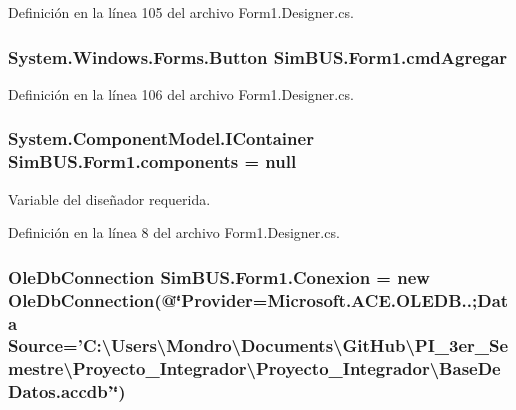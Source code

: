 Definición en la línea 105 del archivo Form1.\-Designer.\-cs.

\subsubsection[{cmd\-Agregar}]{\setlength{\rightskip}{0pt plus 5cm}System.\-Windows.\-Forms.\-Button Sim\-B\-U\-S.\-Form1.\-cmd\-Agregar\hspace{0.3cm}{\ttfamily [private]}}\label{class_sim_b_u_s_1_1_form1_abdbb52215827c126334c3a600b61fdc3}


Definición en la línea 106 del archivo Form1.\-Designer.\-cs.

\subsubsection[{components}]{\setlength{\rightskip}{0pt plus 5cm}System.\-Component\-Model.\-I\-Container Sim\-B\-U\-S.\-Form1.\-components = null\hspace{0.3cm}{\ttfamily [private]}}\label{class_sim_b_u_s_1_1_form1_af68a98b30fbbd7cb29f48f5b2c442670}


Variable del diseñador requerida. 



Definición en la línea 8 del archivo Form1.\-Designer.\-cs.

\subsubsection[{Conexion}]{\setlength{\rightskip}{0pt plus 5cm}Ole\-Db\-Connection Sim\-B\-U\-S.\-Form1.\-Conexion = new Ole\-Db\-Connection(@\char`\"{}Provider=Microsoft.\-A\-C\-E.\-O\-L\-E\-D\-B..;Data Source='C\-:\textbackslash{}\-Users\textbackslash{}\-Mondro\textbackslash{}\-Documents\textbackslash{}\-Git\-Hub\textbackslash{}\-P\-I\-\_\-3er\-\_\-\-Semestre\textbackslash{}\-Proyecto\-\_\-\-Integrador\textbackslash{}\-Proyecto\-\_\-\-Integrador\textbackslash{}\-Base\-De\-Datos.\-accdb'\char`\"{})\hspace{0.3cm}{\ttfamily [private]}}\label{class_sim_b_u_s_1_1_form1_a4e3d828311480904623d457d8de78b34}


